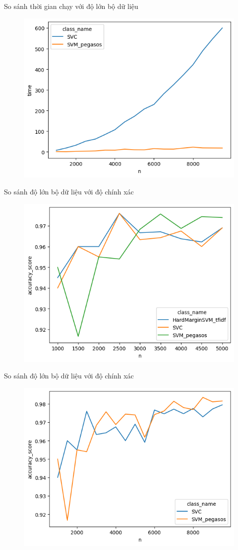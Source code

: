 \documentclass[serif, aspectratio=169]{beamer}
\begin{document}
	\begin{frame}{So sánh thời gian chạy với độ lớn bộ dữ liệu}
		\begin{figure}
			\centering
			\includegraphics[width=0.6\linewidth]{pic/pegasos-vs-svc-n-time.png}
			\label{fig:pegasos-vs-svc-n-time}
		\end{figure}
	\end{frame}
	
	\begin{frame}{So sánh độ lớn bộ dữ liệu với độ chính xác}
		\begin{figure}
			\centering
			\includegraphics[width=0.6\linewidth]{pic/hardmargin-vs-pegasos-n-vs-acc.png}
			\label{fig:hardmargin-vs-pegasos-n-vs-acc}
		\end{figure}
	\end{frame}
	\begin{frame}{So sánh độ lớn bộ dữ liệu với độ chính xác}
		\begin{figure}
			\centering
			\includegraphics[width=0.6\linewidth]{pic/pegasos-vs-svc-n-acc.png}
			\label{fig:pegasos-vs-svc-n-acc}
		\end{figure}
	\end{frame}
\end{document}
